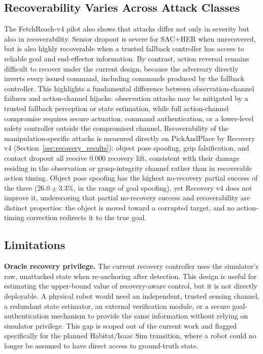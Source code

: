 \documentclass[conference]{IEEEtran}
\begin{document}
\subsection{Recoverability Varies Across Attack Classes}

The FetchReach-v4 pilot also shows that attacks differ not only in severity but also in
recoverability. Sensor dropout is severe for SAC+HER when unrecovered, but is also
highly recoverable when a trusted fallback controller has access to reliable goal and
end-effector information. By contrast, action reversal remains difficult to recover
under the current design, because the adversary directly inverts every issued command,
including commands produced by the fallback controller. This highlights a fundamental
difference between observation-channel failures and action-channel hijacks:
observation attacks may be mitigated by a trusted fallback perception or state
estimation, while full action-channel compromise requires secure actuation, command
authentication, or a lower-level safety controller outside the compromised channel.
Recoverability of the manipulation-specific attacks is measured directly on PickAndPlace
by Recovery v4 (Section~\ref{sec:recovery_results}): object pose spoofing, grip
falsification, and contact dropout all receive $0.000$ recovery lift, consistent with
their damage residing in the observation or grasp-integrity channel rather than in
recoverable action timing. Object pose spoofing has the highest no-recovery partial
success of the three ($26.0\pm3.3\%$, in the range of goal spoofing), yet Recovery v4
does not improve it, underscoring that partial no-recovery success and recoverability are
distinct properties: the object is moved toward a corrupted target, and no action-timing
correction redirects it to the true goal.

\subsection{Limitations}

\textbf{Oracle recovery privilege.}
The current recovery controller uses the simulator's raw, unattacked state when
re-anchoring after detection. This design is useful for estimating the upper-bound value
of recovery-aware control, but it is not directly deployable. A physical robot would
need an independent, trusted sensing channel, a redundant state estimator, an external
verification module, or a secure goal-authentication mechanism to provide the same
information without relying on simulator privilege. This gap is scoped out of the
current work and flagged specifically for the planned Habitat/Isaac Sim transition,
where a robot could no longer be assumed to have direct access to ground-truth state.
\end{document}
